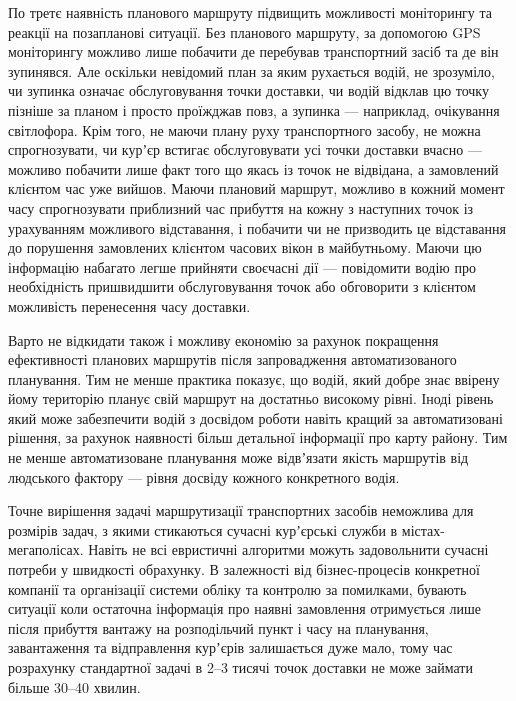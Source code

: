 По третє наявність планового маршруту підвищить можливості моніторингу та реакції на позапланові ситуації. Без планового маршруту, за допомогою GPS моніторингу можливо лише побачити де перебував транспортний засіб та де він зупинявся. Але оскільки невідомий план за яким рухається водій, не зрозуміло, чи зупинка означає обслуговування точки доставки, чи водій відклав цю точку пізніше за планом і просто проїжджав повз, а зупинка --- наприклад, очікування світлофора. Крім того, не маючи плану руху транспортного засобу, не можна спрогнозувати, чи курʼєр встигає обслуговувати усі точки доставки вчасно --- можливо побачити лише факт того що якась із точок не відвідана, а замовлений клієнтом час уже вийшов. Маючи плановий маршрут, можливо в кожний момент часу спрогнозувати приблизний час прибуття на кожну з наступних точок із урахуванням можливого відставання, і побачити чи не призводить це відставання до порушення замовлених клієнтом часових вікон в майбутньому. Маючи цю інформацію набагато легше прийняти своєчасні дії --- повідомити водію про необхідність пришвидшити обслуговування точок або обговорити з клієнтом можливість перенесення часу доставки.

Варто не відкидати також і можливу економію за рахунок покращення ефективності планових маршрутів після запровадження автоматизованого планування. Тим не менше практика показує, що водій, який добре знає ввірену йому територію планує свій маршрут на достатньо високому рівні. Іноді рівень який може забезпечити водій з досвідом роботи навіть кращий за автоматизовані рішення, за рахунок наявності більш детальної інформації про карту району. Тим не менше автоматизоване планування може відвʼязати якість маршрутів від людського фактору --- рівня досвіду кожного конкретного водія.

Точне вирішення задачі маршрутизації транспортних засобів неможлива для розмірів задач, з якими стикаються сучасні курʼєрські служби в містах-мегаполісах. Навіть не всі евристичні алгоритми можуть задовольнити сучасні потреби у швидкості обрахунку. В залежності від бізнес-процесів конкретної компанії та організації системи обліку та контролю за помилками, бувають ситуації коли остаточна інформація про наявні замовлення отримується лише після прибуття вантажу на розподільчий пункт і часу на планування, завантаження та відправлення курʼєрів залишається дуже мало, тому час розрахунку стандартної задачі в 2--3 тисячі точок доставки не може займати більше 30--40 хвилин.

